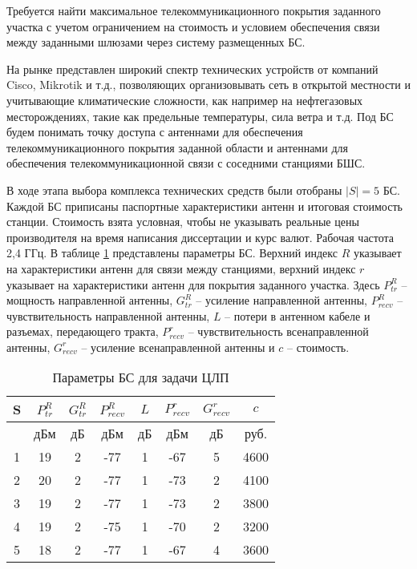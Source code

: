 Требуется найти максимальное телекоммуникационного покрытия заданного участка с учетом ограничением на стоимость и условием обеспечения связи между заданными шлюзами через систему размещенных БС.


На рынке представлен широкий спектр технических устройств от компаний Cisco, Mikrotik и т.д., позволяющих организовывать сеть в открытой местности и учитывающие климатические сложности, как например на нефтегазовых месторождениях, такие как предельные температуры, сила ветра и т.д. Под БС  будем понимать точку доступа с антеннами для обеспечения телекоммуникационного покрытия заданной области и антеннами для обеспечения телекоммуникационной связи с соседними станциями БШС. 

В ходе этапа выбора комплекса технических средств были отобраны $|S| = 5$ БС. Каждой БС приписаны паспортные характеристики антенн и итоговая стоимость станции. Стоимость взята условная, чтобы не указывать реальные цены производителя на время написания диссертации и курс валют. Рабочая частота 2,4 ГГц. В таблице \cref{tab:part4_sta_parameters_mip} представлены параметры БС. Верхний индекс $R$ указывает на характеристики антенн для связи между станциями, верхний индекс $r$ указывает на характеристики антенн для покрытия заданного участка. Здесь $P_{tr}^{R}$ -- мощность направленной антенны, $G_{tr}^R$ -- усиление направленной антенны, $P_{recv}^R$ -- чувствительность направленной антенны, $L$  -- потери в антенном кабеле и разъемах, передающего тракта, $P_{recv}^r$ -- чувствительность всенаправленной антенны, $G_{recv}^r$ -- усиление всенаправленной антенны и $c$ – стоимость.

\begin{table}[h!]\centering
  \begin{tabular}{|c||c|c|c|c|c|c|c|}\hline
      
      S&	$P_{tr}^R$&	$G_{tr}^R$&	$P_{recv}^R$&	$L$&	$P_{recv}^r$&	$G_{recv}^r$&		$c$ \\
      \hline
      &	дБм&	дБ&	дБм&	дБ&	дБм&	дБ&		руб. \\
      \hline
      1&	19&	2&	-77&	1&	-67&	5&	  4600 \\
      2&	20&	2&	-77&	1&	-73&	2&		4100 \\
      3&	19&	2&	-77&	1&	-73&	2&		3800 \\
      4&	19&	2&	-75&	1&	-70&	2&		3200 \\
      5&	18&	2&	-77&	1&	-67&	4&		3600 \\
      \hline
  \end{tabular}\caption{Параметры БС для задачи ЦЛП}\label{tab:part4_sta_parameters_mip}
\end{table}


